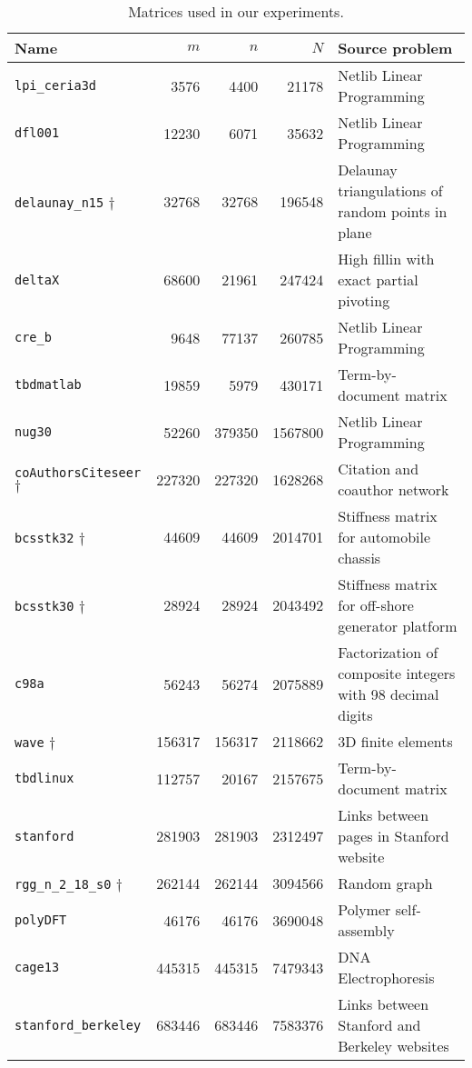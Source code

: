 \begin{table}[h]
	\centering
	\begin{tabular}{|l|r|r|r|p{7cm} |}
		\hline	
		\textbf{Name} & \textbf{$m$} & \textbf{$n$} & \textbf{$N$} & \textbf{Source problem} \\ \hline
		\verb|lpi_ceria3d| 									& 3576 		& 4400 		& 21178 & Netlib Linear Programming \\
		\verb|dfl001| 											& 12230 	& 6071 		& 35632 & Netlib Linear Programming \\ 
		\verb|delaunay_n15| $\dagger$ 			& 32768 	& 32768 	& 196548 & Delaunay triangulations of random points in plane \\ 
		\verb|deltaX| 											& 68600 	& 21961 	& 247424 & High fillin with exact partial pivoting \\
		\verb|cre_b| 												& 9648 		& 77137 	& 260785 & Netlib Linear Programming \\ 
		\verb|tbdmatlab| 										& 19859 	& 5979 		& 430171 & Term-by-document matrix \\ 
		\verb|nug30| 												& 52260 	& 379350 	& 1567800 & Netlib Linear Programming \\ 
		\verb|coAuthorsCiteseer| $\dagger$ 	& 227320 	& 227320 	& 1628268 & Citation and coauthor network\\ 
		\verb|bcsstk32| $\dagger$ 					& 44609 	& 44609 	& 2014701 & Stiffness matrix for automobile chassis \\ 
		\verb|bcsstk30| $\dagger$						& 28924 	& 28924 	& 2043492 & Stiffness matrix for off-shore generator platform \\
		\verb|c98a| 												& 56243 	& 56274 	& 2075889 & Factorization of composite integers with 98 decimal digits  \\ 
		\verb|wave| 	$\dagger$							& 156317 	& 156317 	& 2118662 & 3D finite elements \\
		\verb|tbdlinux| 										& 112757 	& 20167 	& 2157675 & Term-by-document matrix \\
		\verb|stanford| 										& 281903 	& 281903 	& 2312497 & Links between pages in Stanford website \\
		\verb|rgg_n_2_18_s0| $\dagger$ 			& 262144 	& 262144 	& 3094566 & Random graph \\
		\verb|polyDFT| 											& 46176 	& 46176 	& 3690048 & Polymer self-assembly \\ 
		\verb|cage13| 											& 445315 	& 445315 	& 7479343 & DNA Electrophoresis \\
		\verb|stanford_berkeley| 						& 683446 	& 683446 	& 7583376 & Links between Stanford and Berkeley websites \\
		\hline
	\end{tabular}
	\caption{Matrices used in our experiments.} \label{tab:matrices}
\end{table}

